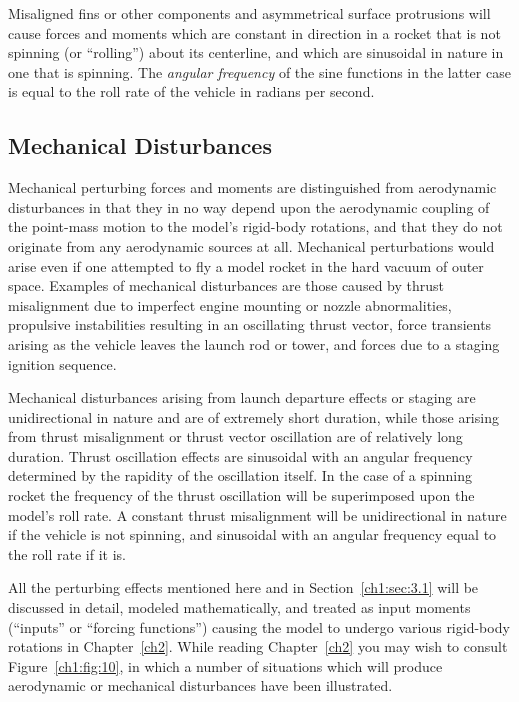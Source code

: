 Misaligned fins or other components and asymmetrical surface protrusions will cause forces and
moments which are constant in direction in a rocket that is not spinning (or ``rolling'') about
its centerline, and which are sinusoidal in nature in one that is spinning. The \emph{angular
frequency} of the sine functions in the latter case is equal to the roll rate of the vehicle in
radians per second.

\subsection{Mechanical Disturbances}\label{ch1:sec:3.2}

Mechanical perturbing forces and moments are distinguished from aerodynamic disturbances in that
they in no way depend upon the aerodynamic coupling of the point-mass motion to the model's
rigid-body rotations, and that they do not originate from any aerodynamic sources at all.
Mechanical perturbations would arise even if one attempted to fly a model rocket in the hard
vacuum of outer space. Examples of mechanical disturbances are those caused by thrust
misalignment due to imperfect engine mounting or nozzle abnormalities, propulsive instabilities
resulting in an oscillating thrust vector, force transients arising as the vehicle leaves the
launch rod or tower, and forces due to a staging ignition sequence.

Mechanical disturbances arising from launch departure effects or staging are unidirectional in
nature and are of extremely short duration, while those arising from thrust misalignment or
thrust vector oscillation are of relatively long duration. Thrust oscillation effects are
sinusoidal with an angular frequency determined by the rapidity of the oscillation itself. In the
case of a spinning rocket the frequency of the thrust oscillation will be superimposed upon the
model's roll rate. A constant thrust misalignment will be unidirectional in nature if the vehicle
is not spinning, and sinusoidal with an angular frequency equal to the roll rate if it is.

All the perturbing effects mentioned here and in Section~\ref{ch1:sec:3.1} will be discussed in
detail, modeled mathematically, and treated as input moments (``inputs'' or ``forcing
functions'') causing the model to undergo various rigid-body rotations in Chapter~\ref{ch2}.
While reading Chapter~\ref{ch2} you may wish to consult Figure~\ref{ch1:fig:10}, in which a
number of situations which will produce aerodynamic or mechanical disturbances have been
illustrated.

